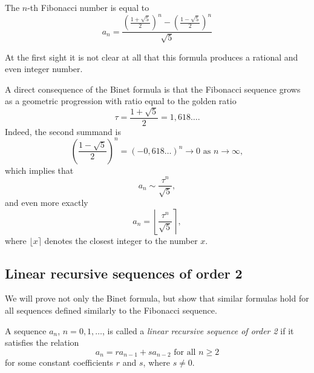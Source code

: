 \begin{page}
\setcounter{section}{1}
\setcounter{subsection}{1}
\setcounter{dfn}{1}
\label{portion:696}

\begin{thm}[Binet]
\label{thm:Binet}
The $n$-th Fibonacci number is equal to
\[
a_n = \frac{\left(\frac{1+\sqrt{5}}2\right)^n - \left(\frac{1-\sqrt{5}}2\right)^n}{\sqrt{5}}
\]
\end{thm}

\end{page}

\begin{page}
\setcounter{section}{1}
\setcounter{subsection}{2}
\setcounter{dfn}{1}
\label{portion:697}


At the first sight it is not clear at all that this formula produces a rational and even integer number.

A direct consequence of the Binet formula is that the Fibonacci sequence grows as a geometric progression with ratio
equal to the golden ratio
\[
\tau = \frac{1+\sqrt{5}}2 = 1,618\ldots.
\]
Indeed, the second summand is
\[
\left(\frac{1-\sqrt{5}}2\right)^n = (-0,618\ldots)^n \to 0 \text{ as } n \to \infty,
\]
which implies that
\[
a_n \sim \frac{\tau^n}{\sqrt{5}},
\]
and even more exactly
\[
a_n = \left\lfloor \frac{\tau^n}{\sqrt{5}} \right\rceil,
\]
where $\lfloor x \rceil$ denotes the closest integer to the number $x$.



\end{page}

\begin{page}
\setcounter{section}{1}
\setcounter{subsection}{2}
\setcounter{dfn}{1}
\label{portion:698}

\subsection{Linear recursive sequences of order 2}
We will prove not only the Binet formula, but show that similar formulas hold for all sequences defined similarly to the Fibonacci sequence.


\end{page}

\begin{page}
\setcounter{section}{1}
\setcounter{subsection}{2}
\setcounter{dfn}{2}
\label{portion:700}

\begin{dfn}
A sequence $a_n$, $n = 0, 1, \ldots$, is called a \emph{linear recursive sequence of order 2} if
it satisfies the relation
\begin{equation}
\label{eqn:LinRec2}
a_n = ra_{n-1} + sa_{n-2} \text{ for all } n \ge 2
\end{equation}
for some constant coefficients $r$ and $s$, where $s \ne 0$.
\end{dfn}

\end{page}

